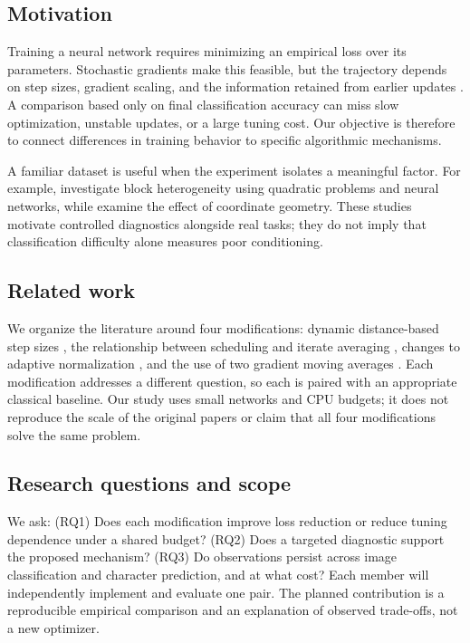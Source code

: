 \subsection{Motivation}
Training a neural network requires minimizing an empirical loss over its parameters.
Stochastic gradients make this feasible, but the trajectory depends on step sizes, gradient
scaling, and the information retained from earlier updates \citep{bottou2018}.
A comparison based only on final classification accuracy can miss slow optimization,
unstable updates, or a large tuning cost. Our objective is therefore to connect differences
in training behavior to specific algorithmic mechanisms.

A familiar dataset is useful when the experiment isolates a meaningful factor.
For example, \citet{zhang2024hessian} investigate block heterogeneity using quadratic problems
and neural networks, while \citet{xie2025geometry} examine the effect of coordinate geometry.
These studies motivate controlled diagnostics alongside real tasks; they do not imply that
classification difficulty alone measures poor conditioning.
\subsection{Related work}
We organize the literature around four modifications: dynamic distance-based step sizes
\citep{ivgi2023dog}, the relationship between scheduling and iterate averaging
\citep{defazio2024schedule}, changes to adaptive normalization \citep{taniguchi2024adopt},
and the use of two gradient moving averages \citep{pagliardini2025ademamix}.
Each modification addresses a different question, so each is paired with an appropriate
classical baseline. Our study uses small networks and CPU budgets; it does not reproduce
the scale of the original papers or claim that all four modifications solve the same problem.
\subsection{Research questions and scope}
We ask: (RQ1) Does each modification improve loss reduction or reduce tuning dependence
under a shared budget? (RQ2) Does a targeted diagnostic support the proposed mechanism?
(RQ3) Do observations persist across image classification and character prediction, and at
what cost? Each member will independently implement and evaluate one pair. The planned
contribution is a reproducible empirical comparison and an explanation of observed trade-offs,
not a new optimizer. 
